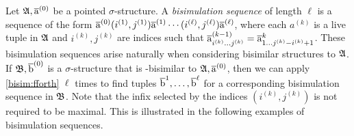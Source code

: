 Let ${\mathfrak{A}}, \overline{\mathrm{a}}^{(0)}$ be a pointed $\sigma$-structure.
A \emph{bisimulation sequence} of length $\ell$ is a sequence of the form $\overline{\mathrm{a}}^{(0)}(i^{(1)}, j^{(1)})\overline{\mathrm{a}}^{(1)}\cdots(i^{(\ell)}, j^{(\ell)})\overline{\mathrm{a}}^{(\ell)}$, where each $a^{(k)}$ is a live tuple in ${\mathfrak{A}}$ and $i^{(k)}, j^{(k)}$ are indices such that $\overline{\mathrm{a}}_{i^{(k)}\ldots j^{(k)}}^{(k-1)} = \overline{\mathrm{a}}_{1\ldots j^{(k)}-i^{(k)}+1}^{k}$.
These bisimulation sequences arise naturally when considering bisimilar structures to ${\mathfrak{A}}$.
If ${\mathfrak{B}}, \overline{\mathrm{b}}^{(0)}$ is a $\sigma$-structure that is \FGF-bisimilar to ${\mathfrak{A}}, \overline{\mathrm{a}}^{(0)}$, then we can apply \ref{bisim:fforth} $\ell$ times to find tuples $\overline{\mathrm{b}}^{1}, \ldots, \overline{\mathrm{b}}^{\ell}$ for a corresponding bisimulation sequence in ${\mathfrak{B}}$.
Note that the infix selected by the indices $(i^{(k)}, j^{(k)})$ is not required to be maximal.
This is illustrated in the following examples of bisimulation sequences.

